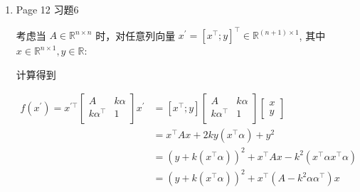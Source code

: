 \documentclass{article}
\begin{document}
\begin{spacing}{1.5}
\begin{enumerate}
\begin{spacing}{1.5}
\begin{equation*}
\begin{array}{ll}
            \right] \\
            & = 
            \left[
                \begin{array}{cc}
                    A^{-1} + A^{-1}B(D_m-CA^{-1}B)^{-1}CA^{-1} & -A^{-1}B(D_m-CA^{-1}B)^{-1} \\
                    -(D_m-CA^{-1}B)^{-1}CA^{-1} & (D_m-CA^{-1}B)^{-1}\\
                \end{array}
            \right]
        \end{array}
    \end{equation*}
    \end{spacing}
    非常丑，但验证了一下应该是对的。左上角似乎和Woodbury公式的形式是一致的。
    
    \item Page 12 习题6
    
    考虑当 $A\in \mathbb{R}^{n\times n}$ 时，对任意列向量 $x^\prime=\left[x^\top; y\right]^\top\in\mathbb{R}^{(n+1)\times 1}$, 其中 $x\in\mathbb{R}^{n\times 1}, y\in\mathbb{R}$:

    计算得到

    \begin{spacing}{1.5}
        
    \begin{equation*}
        \begin{array}{ll}
            f(x^\prime)=x^{\prime\top}\left[\begin{array}{cc}A&k\alpha\\k\alpha^\top&1\\\end{array}\right]x^\prime 
            &= 
            \left[x^\top; y\right]\left[\begin{array}{cc}A&k\alpha\\k\alpha^\top&1\\\end{array}\right]\left[\begin{array}{c}x\\y\end{array}\right]
            \\
            &= x^\top Ax + 2ky(x^\top\alpha)+y^2
            \\
            &= \left(y + k(x^\top\alpha)\right)^2 + x^\top Ax - k^2(x^\top\alpha x^\top\alpha)\\
            &= \left(y + k(x^\top\alpha)\right)^2 + x^\top (A - k^2\alpha\alpha^\top) x

        \end{array}
    \end{equation*}


\end{spacing}
\end{enumerate}
\end{spacing}
\end{document}
